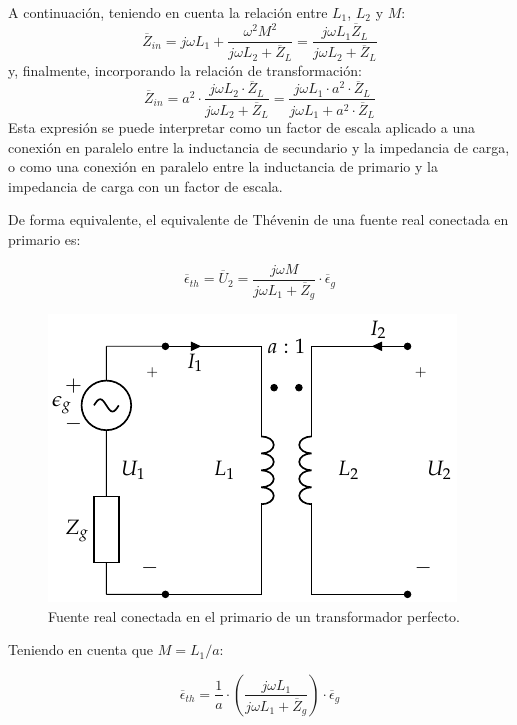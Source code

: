 A continuación, teniendo en cuenta la relación entre $L_1$, $L_2$ y
$M$:
\[
  \overline{Z}_{in} = j\omega L_1 + \frac{\omega^2 M^2}{j\omega L_2 +
    \overline{Z}_L} = \frac{j\omega L_1 \overline{Z}_L}{j\omega L_2 +
    \overline{Z}_L}
\]
y, finalmente, incorporando la relación de transformación:
\begin{equation}
  \label{eq:trafo-perfecto-impedancia-entrada}
  \overline{Z}_{in} =  a^2 \cdot \frac{j \omega L_2 \cdot \overline{Z}_L}{j\omega L_2 + \overline{Z}_L} =  \frac{j \omega L_1 \cdot a^2 \cdot \overline{Z}_L}{j\omega L_1 + a^2 \cdot \overline{Z}_L}
\end{equation}
Esta expresión se puede interpretar como un factor de escala aplicado
a una conexión en paralelo entre la inductancia de secundario y la
impedancia de carga, o como una conexión en paralelo entre la
inductancia de primario y la impedancia de carga con un factor de
escala.

De forma equivalente, el equivalente de Thévenin de una fuente real
conectada en primario es:

\[
  \overline{\epsilon}_{th} = \overline{U}_2 = \frac{j\omega M}{j\omega
    L_1 + \overline{Z}_g} \cdot \overline{\epsilon}_g
\]

\begin{figure}
  \centering
  \includegraphics[height=0.2\textheight]{../figs/Trafo_Perfecto_FuentePrimario.pdf}
  \caption{Fuente real conectada en el primario de un transformador perfecto.}
  \label{fig:trafo-perfecto-fuente-primario}
\end{figure}
Teniendo en cuenta que $M = L_1/a$:

\begin{equation}
  \label{eq:trafo-perfecto-tension-thevenin}
  \overline{\epsilon}_{th} = \frac{1}{a} \cdot \left(\frac{j\omega
      L_1}{j\omega L_1 + \overline{Z}_g}\right) \cdot
  \overline{\epsilon}_g
\end{equation}


